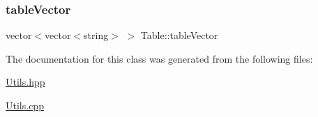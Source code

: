 \hypertarget{class_table_a9052c218f9eae23950459720e8069e62}{}\label{class_table_a9052c218f9eae23950459720e8069e62} 
\subsubsection{\texorpdfstring{table\+Vector}{tableVector}}
{\footnotesize\ttfamily vector$<$vector$<$string$>$ $>$ Table\+::table\+Vector\hspace{0.3cm}{\ttfamily [private]}}



The documentation for this class was generated from the following files\+:\begin{DoxyCompactItemize}
\item 
\hyperlink{_utils_8hpp}{Utils.\+hpp}\item 
\hyperlink{_utils_8cpp}{Utils.\+cpp}\end{DoxyCompactItemize}
